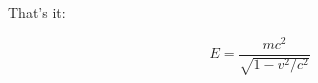 \documentclass[12pt]{article}
\begin{document}
That's it:

\begin{equation}
  E = \frac{m c^2}{\sqrt{1-v^2/c^2}}
\end{equation}
\end{document}
